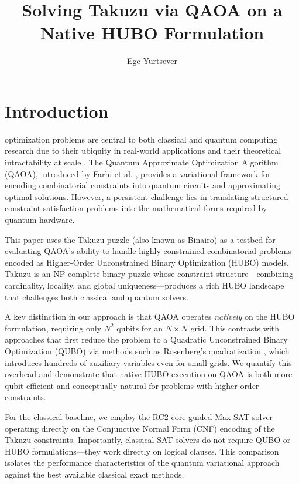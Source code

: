 \documentclass[eng]{ajceam-class}
\title{Solving Takuzu via QAOA on a Native HUBO Formulation}
\author[1]{Ege Yurtsever}
\affil[1]{Faculty of Engineering and Natural Sciences, Sabancı University, Turkey}
\begin{document}
\maketitle
\thispagestyle{fancy}
\printcontactdata

\section{Introduction}
 optimization problems are central to both classical and quantum computing research due to their ubiquity in real-world applications and their theoretical intractability at scale \cite{lucas2014ising}. The Quantum Approximate Optimization Algorithm (QAOA), introduced by Farhi et al. \cite{farhi2014qaoa}, provides a variational framework for encoding combinatorial constraints into quantum circuits and approximating optimal solutions. However, a persistent challenge lies in translating structured constraint satisfaction problems into the mathematical forms required by quantum hardware.

This paper uses the Takuzu puzzle (also known as Binairo) as a testbed for evaluating QAOA's ability to handle highly constrained combinatorial problems encoded as Higher-Order Unconstrained Binary Optimization (HUBO) models. Takuzu is an NP-complete binary puzzle \cite{takuzunp2016} whose constraint structure---combining cardinality, locality, and global uniqueness---produces a rich HUBO landscape that challenges both classical and quantum solvers.

A key distinction in our approach is that QAOA operates \emph{natively} on the HUBO formulation, requiring only $N^2$ qubits for an $N \times N$ grid. This contrasts with approaches that first reduce the problem to a Quadratic Unconstrained Binary Optimization (QUBO) via methods such as Rosenberg's quadratization \cite{rosenberg1975reduction}, which introduces hundreds of auxiliary variables even for small grids. We quantify this overhead and demonstrate that native HUBO execution on QAOA is both more qubit-efficient and conceptually natural for problems with higher-order constraints.

For the classical baseline, we employ the RC2 core-guided Max-SAT solver \cite{ignatiev2019rc2} operating directly on the Conjunctive Normal Form (CNF) encoding of the Takuzu constraints. Importantly, classical SAT solvers do not require QUBO or HUBO formulations---they work directly on logical clauses. This comparison isolates the performance characteristics of the quantum variational approach against the best available classical exact methods.
\end{document}
